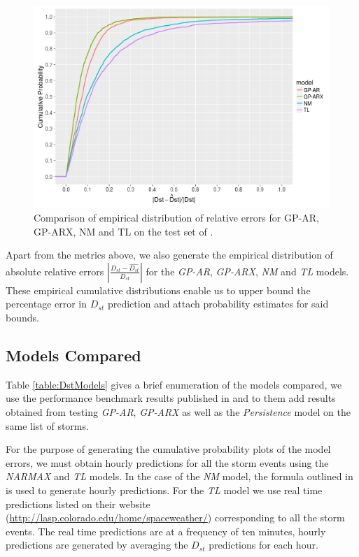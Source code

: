 \documentclass[referee,a4paper,12pt,traditabstract]{swsc}
\begin{document}
\begin{linenumbers}
\begin{figure}
   \centering
   \includegraphics[width=\textwidth]{Compare_RelProb.png}
   \caption{Comparison of empirical distribution of relative errors for GP-AR, GP-ARX, NM and TL on the test set of \citet{Ji2012}.}
   \label{fig:relprob}
\end{figure}


Apart from the metrics above, we also generate the empirical distribution of absolute relative errors $|\frac{D_{st} - \hat{D_{st}}}{D_{st}}|$ for the \emph{GP-AR}, \emph{GP-ARX}, \emph{NM} and \emph{TL} models. These empirical cumulative distributions enable us to upper bound the percentage error in $D_{st}$ prediction and attach probability estimates for said bounds.


\subsection{Models Compared}

Table \ref{table:DstModels} gives a brief enumeration of the models compared, we use the performance benchmark results published in \citet{Ji2012} and to them add results obtained from testing \emph{GP-AR}, \emph{GP-ARX} as well as the \emph{Persistence} model on the same list of storms. 

For the purpose of generating the cumulative probability plots of the model errors, we must obtain hourly predictions for all the storm events using the \emph{NARMAX} and \emph{TL} models. In the case of the \emph{NM} model, the formula outlined in \citet{balikhin:narmax} is used to generate hourly predictions. For the \emph{TL} model we use real time predictions listed on their website (\url{http://lasp.colorado.edu/home/spaceweather/}) corresponding to all the storm events. The real time predictions are at a frequency of ten minutes, hourly predictions are generated by averaging the $D_{st}$ predictions for each hour.


\end{linenumbers}
\end{document}
